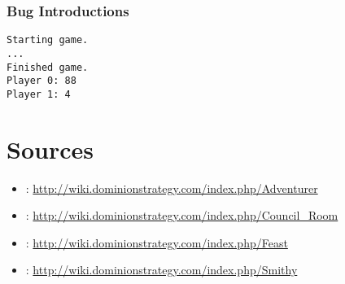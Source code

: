 \documentclass[11pt]{article}
\begin{document}
\subsubsection{Bug Introductions}
\label{sec:org8ce9f95}

\begin{verbatim}
Starting game.
...
Finished game.
Player 0: 88
Player 1: 4
\end{verbatim}

\section{Sources}
\label{sec:org3e40217}

\begin{itemize}
\item\relax [1]: \url{http://wiki.dominionstrategy.com/index.php/Adventurer}
\item\relax [2]: \url{http://wiki.dominionstrategy.com/index.php/Council\_Room}
\item\relax [3]: \url{http://wiki.dominionstrategy.com/index.php/Feast}
\item\relax [4]: \url{http://wiki.dominionstrategy.com/index.php/Smithy}
\end{itemize}
\end{document}
